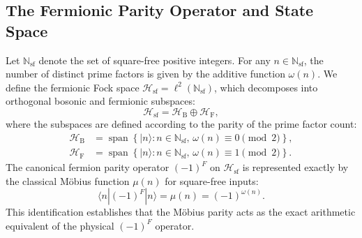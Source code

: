 \documentclass[11pt,a4paper]{article}
\theoremstyle{definition}
\begin{document}
	\subsection{The Fermionic Parity Operator and State Space}
	Let $\mathbb{N}_{\text{sf}}$ denote the set of square-free positive integers. For any $n \in \mathbb{N}_{\text{sf}}$, the number of distinct prime factors is given by the additive function $\omega(n)$. We define the fermionic Fock space $\mathcal{H}_{\text{sf}} = \ell^2(\mathbb{N}_{\text{sf}})$, which decomposes into orthogonal bosonic and fermionic subspaces:
	\begin{equation}
		\mathcal{H}_{\text{sf}} = \mathcal{H}_{\text{B}} \oplus \mathcal{H}_{\text{F}},
	\end{equation}
	where the subspaces are defined according to the parity of the prime factor count:
	\begin{align}
		\mathcal{H}_{\text{B}} &= \operatorname{span} \left\{ |n\rangle : n \in \mathbb{N}_{\text{sf}}, \, \omega(n) \equiv 0 \pmod 2 \right\}, \\
		\mathcal{H}_{\text{F}} &= \operatorname{span} \left\{ |n\rangle : n \in \mathbb{N}_{\text{sf}}, \, \omega(n) \equiv 1 \pmod 2 \right\}.
	\end{align}
	The canonical fermion parity operator $(-1)^F$ on $\mathcal{H}_{\text{sf}}$ is represented exactly by the classical Möbius function $\mu(n)$ for square-free inputs:
	\begin{equation}
		\langle n | (-1)^F | n \rangle = \mu(n) = (-1)^{\omega(n)}.
	\end{equation}
	This identification establishes that the Möbius parity acts as the exact arithmetic equivalent of the physical $(-1)^F$ operator.
	
\end{document}
